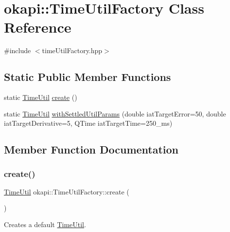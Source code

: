\hypertarget{classokapi_1_1TimeUtilFactory}{}\section{okapi\+::Time\+Util\+Factory Class Reference}
\label{classokapi_1_1TimeUtilFactory}


{\ttfamily \#include $<$time\+Util\+Factory.\+hpp$>$}

\subsection*{Static Public Member Functions}
\begin{DoxyCompactItemize}
\item 
static \mbox{\hyperlink{classokapi_1_1TimeUtil}{Time\+Util}} \mbox{\hyperlink{classokapi_1_1TimeUtilFactory_a0a1a191219798c66ed0046ea78aee88b}{create}} ()
\item 
static \mbox{\hyperlink{classokapi_1_1TimeUtil}{Time\+Util}} \mbox{\hyperlink{classokapi_1_1TimeUtilFactory_a870592766590f3ce9e0d0b09bc5e236f}{with\+Settled\+Util\+Params}} (double iat\+Target\+Error=50, double iat\+Target\+Derivative=5, Q\+Time iat\+Target\+Time=250\+\_\+ms)
\end{DoxyCompactItemize}


\subsection{Member Function Documentation}
\mbox{\label{classokapi_1_1TimeUtilFactory_a0a1a191219798c66ed0046ea78aee88b}} 
\subsubsection{\texorpdfstring{create()}{create()}}
{\footnotesize\ttfamily \mbox{\hyperlink{classokapi_1_1TimeUtil}{Time\+Util}} okapi\+::\+Time\+Util\+Factory\+::create (\begin{DoxyParamCaption}{ }\end{DoxyParamCaption})\hspace{0.3cm}{\ttfamily [static]}}

Creates a default \mbox{\hyperlink{classokapi_1_1TimeUtil}{Time\+Util}}. \mbox{\label{classokapi_1_1TimeUtilFactory_a870592766590f3ce9e0d0b09bc5e236f}} 
